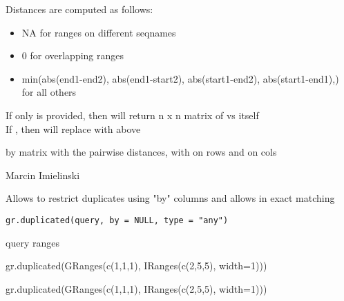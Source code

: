 \documentclass[a4paper]{book}
\begin{document}
%
\begin{Details}\relax
Distances are computed as follows:
\begin{itemize}

\item NA for ranges on different seqnames
\item 0 for overlapping ranges
\item min(abs(end1-end2), abs(end1-start2), abs(start1-end2), abs(start1-end1),) for all others

\end{itemize}

If only  is provided, then will return n x n matrix of  vs itself \\{}
If , then will replace  with  above
\end{Details}
%
\begin{Value}
 by  matrix with the pairwise distances, with  on rows and  on cols
\end{Value}
%
\begin{Author}\relax
Marcin Imielinski
\end{Author}
%
\begin{Description}\relax
Allows to restrict duplicates using "by" columns and allows in exact matching
\end{Description}
%
\begin{Usage}
\begin{verbatim}
gr.duplicated(query, by = NULL, type = "any")
\end{verbatim}
\end{Usage}
%
\begin{Arguments}
\begin{ldescription}
\item[\code{query}] query ranges
\end{ldescription}
\end{Arguments}
%
\begin{Examples}
\begin{ExampleCode}
gr.duplicated(GRanges(c(1,1,1), IRanges(c(2,5,5), width=1)))

gr.duplicated(GRanges(c(1,1,1), IRanges(c(2,5,5), width=1)))

\end{ExampleCode}
\end{Examples}
\end{document}

